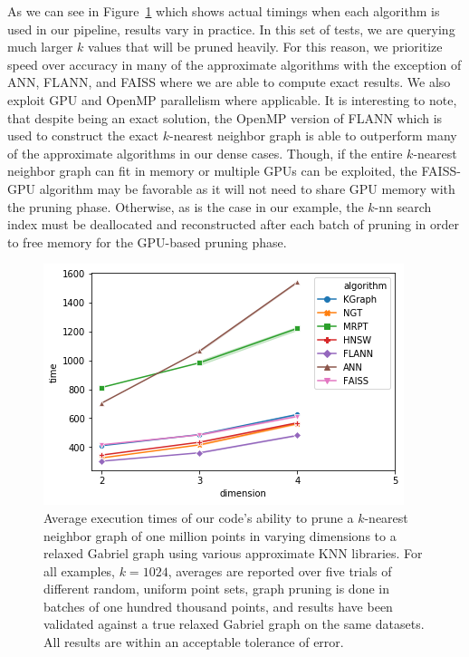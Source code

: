As we can see in Figure~\ref{fig:knn_benchmark} which shows actual timings when each algorithm is used in our pipeline, results vary in practice.
%
In this set of tests, we are querying much larger $k$ values that will be pruned heavily.
%
For this reason, we prioritize speed over accuracy in many of the approximate algorithms with the exception of ANN, FLANN, and FAISS where we are able to compute exact results.
%
We also exploit GPU and OpenMP parallelism where applicable.
%
It is interesting to note, that despite being an exact solution, the OpenMP version of FLANN which is used to construct the exact $k$-nearest neighbor graph is able to outperform many of the approximate algorithms in our dense cases.
%
Though, if the entire $k$-nearest neighbor graph can fit in memory or multiple GPUs can be exploited, the FAISS-GPU algorithm may be favorable as it will not need to share GPU memory with the pruning phase.
%
Otherwise, as is the case in our example, the $k$-nn search index must be deallocated and reconstructed after each batch of pruning in order to free memory for the GPU-based pruning phase.

\begin{figure}[htbp]
    \centering
      \includegraphics[width=.95\linewidth]{figs/chap7/relaxed_gabriel_benchmark_1M.png}
    \caption{Average execution times of our code's ability to prune a
    $k$-nearest neighbor graph of one million points in varying dimensions
    to a relaxed Gabriel graph using various approximate KNN libraries.
    For all examples, $k=1024$, averages are reported over five trials
    of different random, uniform point sets, graph pruning is done
    in batches of one hundred thousand points, and results have been
    validated against a true relaxed Gabriel graph on the same datasets.
    All results are within an acceptable tolerance of error.
  }
  \label{fig:knn_benchmark}
\end{figure}

